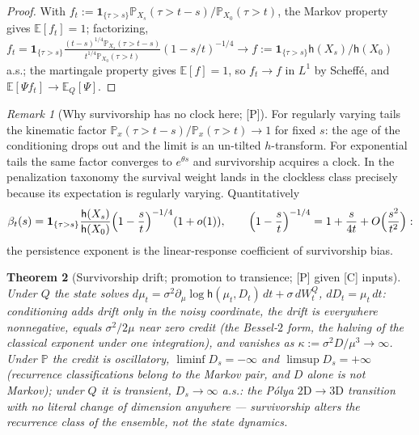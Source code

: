 \documentclass[11pt]{article}
\newtheorem{theorem}{Theorem}[section]
\theoremstyle{definition}
\theoremstyle{remark}
\newtheorem{remark}[theorem]{Remark}
\newcommand{\PP}{\mathbb{P}}
\newcommand{\E}{\mathbb{E}}
\newcommand{\one}{\mathbf{1}}
\newcommand{\hm}{\mathsf{h}}
\begin{document}
\begin{proof}
With $f_t:=\one_{\{\tau>s\}}\PP_{X_s}(\tau>t-s)/\PP_{X_0}(\tau>t)$,
the Markov property gives $\E[f_t]=1$; factorizing,
$f_t=\one_{\{\tau>s\}}
\frac{(t-s)^{1/4}\PP_{X_s}(\tau>t-s)}{t^{1/4}\PP_{X_0}(\tau>t)}
(1-s/t)^{-1/4}\to f:=\one_{\{\tau>s\}}\hm(X_s)/\hm(X_0)$ a.s.; the
martingale property gives $\E[f]=1$, so $f_t\to f$ in $L^1$ by
Scheff\'e, and $\E[\Psi f_t]\to\E_Q[\Psi]$.
\end{proof}

\begin{remark}[Why survivorship has no clock here; {[P]}]
\label{rem:noclock}
For regularly varying tails the kinematic factor
$\PP_x(\tau>t-s)/\PP_x(\tau>t)\to1$ for fixed $s$: the age of the
conditioning drops out and the limit is an un-tilted $h$-transform.
For exponential tails the same factor converges to $e^{\theta s}$ and
survivorship acquires a clock. In the penalization taxonomy
\cite{RVY06} the survival weight lands in the clockless class
precisely because its expectation is regularly varying. Quantitatively
\begin{equation}\label{eq:rate}
\beta_t(s)=\one_{\{\tau>s\}}\frac{\hm(X_s)}{\hm(X_0)}
\Bigl(1-\frac st\Bigr)^{-1/4}(1+o(1)),
\qquad
\Bigl(1-\frac st\Bigr)^{-1/4}=1+\frac{s}{4t}+O\Bigl(\frac{s^2}{t^2}\Bigr):
\end{equation}
the persistence exponent is the linear-response coefficient of
survivorship bias.
\end{remark}

\begin{theorem}[Survivorship drift; promotion to transience;
{[P]} given {[C]} inputs]\label{thm:drift}
Under $Q$ the state solves
$d\mu_t=\sigma^2\partial_\mu\log\hm(\mu_t,D_t)\,dt+\sigma\,dW^Q_t$,
$dD_t=\mu_t\,dt$: conditioning adds drift only in the noisy
coordinate, the drift is everywhere nonnegative, equals
$\sigma^2/2\mu$ near zero credit (the Bessel-$2$ form, the halving of
the classical exponent under one integration), and vanishes as
$\kappa:=\sigma^2D/\mu^3\to\infty$. Under $\PP$ the credit is oscillatory,
$\liminf D_s=-\infty$ and $\limsup D_s=+\infty$ (recurrence
classifications belong to the Markov pair, and $D$ alone is not
Markov); under $Q$ it is transient, $D_s\to\infty$ a.s.: the
P\'olya $2\mathrm D\to3\mathrm D$ transition with no literal change of
dimension anywhere --- survivorship alters the recurrence class of the
ensemble, not the state dynamics.
\end{theorem}
\end{document}
